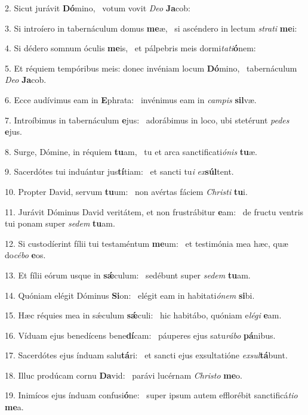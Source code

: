 2. Sicut jurávit \textbf{Dó}mino, \ast\  votum vovit \textit{De}\textit{o} \textbf{Ja}cob:\

3. Si introíero in tabernáculum domus \textbf{me}æ, \ast\  si ascéndero in lectum \textit{stra}\textit{ti} \textbf{me}i:\

4. Si dédero somnum óculis \textbf{me}is, \ast\  et pálpebris meis dormi\textit{ta}\textit{ti}\textbf{ó}nem:\

5. Et réquiem tempóribus meis: donec invéniam locum \textbf{Dó}mino, \ast\  tabernáculum \textit{De}\textit{o} \textbf{Ja}cob.\

6. Ecce audívimus eam in \textbf{E}phrata: \ast\  invénimus eam in \textit{cam}\textit{pis} \textbf{sil}væ.\

7. Introíbimus in tabernáculum \textbf{e}jus: \ast\  adorábimus in loco, ubi stetérunt \textit{pe}\textit{des} \textbf{e}jus.\

8. Surge, Dómine, in réquiem \textbf{tu}am, \ast\  tu et arca sanctificati\textit{ó}\textit{nis} \textbf{tu}æ.\

9. Sacerdótes tui induántur jus\textbf{tí}tiam: \ast\  et sancti tu\textit{i} \textit{ex}\textbf{súl}tent.\

10. Propter David, servum \textbf{tu}um: \ast\  non avértas fáciem \textit{Chris}\textit{ti} \textbf{tu}i.\

11. Jurávit Dóminus David veritátem, et non frustrábitur \textbf{e}am: \ast\  de fructu ventris tui ponam super \textit{se}\textit{dem} \textbf{tu}am.\

12. Si custodíerint fílii tui testaméntum \textbf{me}um: \ast\  et testimónia mea hæc, quæ do\textit{cé}\textit{bo} \textbf{e}os.\

13. Et fílii eórum usque in \textbf{sǽ}culum: \ast\  sedébunt super \textit{se}\textit{dem} \textbf{tu}am.\

14. Quóniam elégit Dóminus \textbf{Si}on: \ast\  elégit eam in habitati\textit{ó}\textit{nem} \textbf{si}bi.\

15. Hæc réquies mea in sǽculum \textbf{sǽ}culi: \ast\  hic habitábo, quóniam e\textit{lé}\textit{gi} \textbf{e}am.\

16. Víduam ejus benedícens bene\textbf{dí}cam: \ast\  páuperes ejus satu\textit{rá}\textit{bo} \textbf{pá}nibus.\

17. Sacerdótes ejus índuam salu\textbf{tá}ri: \ast\  et sancti ejus exsultatióne \textit{ex}\textit{sul}\textbf{tá}bunt.\

18. Illuc prodúcam cornu \textbf{Da}vid: \ast\  parávi lucérnam \textit{Chris}\textit{to} \textbf{me}o.\

19. Inimícos ejus índuam confusi\textbf{ó}ne: \ast\  super ipsum autem efflorébit sanctificá\textit{ti}\textit{o} \textbf{me}a.\

